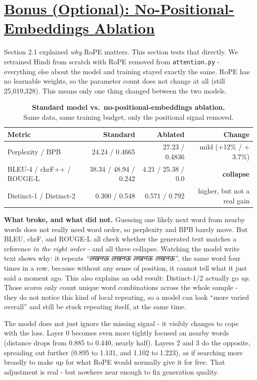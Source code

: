 \documentclass[11pt]{article}
\newcommand{\dn}[1]{{\devanagarifont #1}}
\newcommand{\figcap}[2]{\textbf{#1}\\[2pt]#2}
\begin{document}
\section{\underline{Bonus (Optional): No-Positional-Embeddings Ablation}}

Section 2.1 explained \emph{why} RoPE matters. This section tests that directly. We retrained Hindi from scratch with RoPE removed from \texttt{attention.py} - everything else about the model and training stayed exactly the same. RoPE has no learnable weights, so the parameter count does not change at all (still 25,019,328). This means only one thing changed between the two models.

\begin{table}[h]
\centering \small
\begin{tabular}{lrrr}
\toprule
Metric & Standard & Ablated & Change \\
\midrule
Perplexity / BPB & 24.24 / 0.4665 & 27.23 / 0.4836 & mild ($+$12\% / $+$3.7\%) \\
BLEU-4 / chrF++ / ROUGE-L & 38.34 / 48.94 / 0.242 & 4.21 / 25.38 / 0.0 & \textbf{collapse} \\
Distinct-1 / Distinct-2 & 0.300 / 0.548 & 0.571 / 0.792 & higher, but not a real gain \\
\bottomrule
\end{tabular}
\caption{\figcap{Standard model vs.\ no-positional-embeddings ablation.}{Same data, same training budget, only the positional signal removed.}}
\end{table}

\textbf{What broke, and what did not.} Guessing one likely next word from nearby words does not really need word order, so perplexity and BPB barely move. But BLEU, chrF, and ROUGE-L all check whether the generated text matches a reference \emph{in the right order} - and all three collapse. Watching the model write text shows why: it repeats \emph{``\dn{लखनऊ लखनऊ लखनऊ लखनऊ}''}, the same word four times in a row, because without any sense of position, it cannot tell what it just said a moment ago. This also explains an odd result: Distinct-1/2 actually go \emph{up}. Those scores only count unique word combinations across the whole sample - they do not notice this kind of local repeating, so a model can look ``more varied overall'' and still be stuck repeating itself, at the same time.

The model does not just ignore the missing signal - it visibly changes to cope with the loss. Layer 0 becomes even more tightly focused on nearby words (distance drops from 0.885 to 0.440, nearly half). Layers 2 and 3 do the opposite, spreading out further (0.895 to 1.131, and 1.102 to 1.223), as if searching more broadly to make up for what RoPE would normally give it for free. That adjustment is real - but nowhere near enough to fix generation quality.
\end{document}
